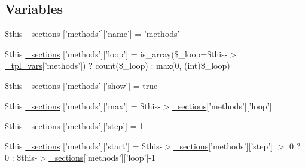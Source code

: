\subsection*{\-Variables}
\begin{DoxyCompactItemize}
\item 
\$this \hyperlink{default_234d6fa4bfd5eef6424a9ddc74a166350_2_06_06-14_05_06_06-1407541581_05method_8tpl_8php_ac899d43f92b67b4b0150170abc3c309e}{\-\_\-sections} \mbox{[}'methods'\mbox{]}\mbox{[}'name'\mbox{]} = 'methods'
\item 
\$this \hyperlink{default_234d6fa4bfd5eef6424a9ddc74a166350_2_06_06-14_05_06_06-1407541581_05method_8tpl_8php_ad2a81d4f56456e84bac7eb16d5214882}{\-\_\-sections} \mbox{[}'methods'\mbox{]}\mbox{[}'loop'\mbox{]} = is\-\_\-array(\$\-\_\-loop=\$this-\/$>$\hyperlink{_06_06127_05_06_0612781687_05pkgelementindex_8tpl_8php_a4a4846d8e68d455590131a05697f67a3}{\-\_\-tpl\-\_\-vars}\mbox{[}'methods'\mbox{]}) ? count(\$\-\_\-loop) \-: max(0, (int)\$\-\_\-loop)
\item 
\$this \hyperlink{default_234d6fa4bfd5eef6424a9ddc74a166350_2_06_06-14_05_06_06-1407541581_05method_8tpl_8php_a00d4d90d9dd571d0f3d80c1a9918a7ba}{\-\_\-sections} \mbox{[}'methods'\mbox{]}\mbox{[}'show'\mbox{]} = true
\item 
\$this \hyperlink{default_234d6fa4bfd5eef6424a9ddc74a166350_2_06_06-14_05_06_06-1407541581_05method_8tpl_8php_abbdaba9e727b1127d22dd8d909673da3}{\-\_\-sections} \mbox{[}'methods'\mbox{]}\mbox{[}'max'\mbox{]} = \$this-\/$>$\hyperlink{_06_06127_05_06_0612781687_05pkgelementindex_8tpl_8php_a9e3d26b39edfe29c3f29b8035ef33828}{\-\_\-sections}\mbox{[}'methods'\mbox{]}\mbox{[}'loop'\mbox{]}
\item 
\$this \hyperlink{default_234d6fa4bfd5eef6424a9ddc74a166350_2_06_06-14_05_06_06-1407541581_05method_8tpl_8php_ad8259cd643f0fbbc6ea85de93ed08e9d}{\-\_\-sections} \mbox{[}'methods'\mbox{]}\mbox{[}'step'\mbox{]} = 1
\item 
\$this \hyperlink{default_234d6fa4bfd5eef6424a9ddc74a166350_2_06_06-14_05_06_06-1407541581_05method_8tpl_8php_aeeffbf5fc6db9e3f1c3c1174ce219f4f}{\-\_\-sections} \mbox{[}'methods'\mbox{]}\mbox{[}'start'\mbox{]} = \$this-\/$>$\hyperlink{_06_06127_05_06_0612781687_05pkgelementindex_8tpl_8php_a9e3d26b39edfe29c3f29b8035ef33828}{\-\_\-sections}\mbox{[}'methods'\mbox{]}\mbox{[}'step'\mbox{]} $>$ 0 ? 0 \-: \$this-\/$>$\hyperlink{_06_06127_05_06_0612781687_05pkgelementindex_8tpl_8php_a9e3d26b39edfe29c3f29b8035ef33828}{\-\_\-sections}\mbox{[}'methods'\mbox{]}\mbox{[}'loop'\mbox{]}-\/1

\end{DoxyCompactItemize}
